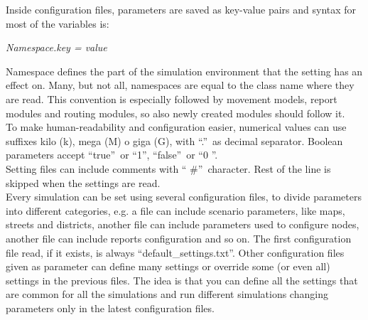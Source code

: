 
Inside configuration files, parameters are saved as key-value pairs and syntax for most of the
variables is:

\begin{center}
\textit{Namespace.key = value}
\end{center}

Namespace defines the part of the simulation environment that the setting has an effect on. Many, but not all, namespaces are equal to the class name where they are read. This convention is especially followed by movement models, report modules and routing modules, so also newly created modules should follow it.
\\

To make human-readability and configuration easier, numerical values can use suffixes kilo (k), mega (M) o giga (G), with \textquotedblleft .\textquotedblright \ as decimal separator. Boolean parameters accept \textquotedblleft true\textquotedblright \
 or \textquotedblleft 1\textquotedblright , \textquotedblleft false\textquotedblright \ or \textquotedblleft 0 \textquotedblright .
\\
 
Setting files can include comments with \textquotedblleft
\#\textquotedblright \ character. Rest of the line is skipped when the settings are read.
\\

Every simulation can be set using several configuration files, to divide parameters into different categories, e.g. a file can include scenario parameters, like maps, streets and districts, another file can include parameters used to configure nodes, another file can include reports configuration and so on. The first configuration file read, if it exists, is always \textquotedblleft default\_settings.txt\textquotedblright. Other configuration files given as parameter can define many settings or override some (or even all) settings in the previous files. The idea is that you can define all the settings that are common for all the simulations and run different simulations changing parameters only in the latest configuration files.
\\


